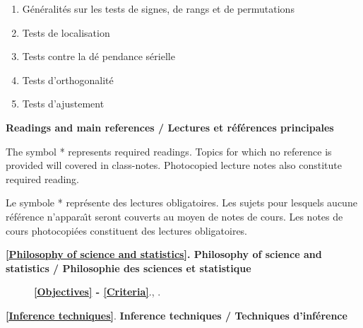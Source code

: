 \documentclass[titlepage,11pt,amstex]{article}
\begin{document}
\begin{enumerate}
\item \label{Sign and rank tests}G\'{e}n\'{e}ralit\'{e}s sur les tests de
signes, de rangs et de permutations

\item \label{Distribution-free location tests}Tests de localisation

\item \label{Distribution-free serial dependence tests}Tests contre la d\'{e}%
pendance s\'{e}rielle

\item \label{Distribution-free orthogonality tests}Tests d'orthogonalit\'{e}

\item \label{Goodness-of-fit tests}Tests d'ajustement
\end{enumerate}

\newpage

\begin{center}
\textbf{Readings and main references / Lectures et r\'{e}f\'{e}rences
principales }

\quad
\end{center}

\quad

The symbol * represents required readings. Topics for which no reference is
provided will covered in class-notes. Photocopied lecture notes also
constitute required reading.

Le symbole * repr\'{e}sente des lectures obligatoires. Les sujets pour
lesquels aucune r\'{e}f\'{e}rence n'appara\^{\i}t seront couverts au moyen
de notes de cours. Les notes de cours photocopi\'{e}es constituent des
lectures obligatoires.

\quad

\noindent \textbf{\ref{Philosophy of science and statistics}. Philosophy of
science and statistics / Philosophie des sciences et statistique}

\quad

\begin{description}
\item[\quad ] \textbf{\ref{Objectives} - \ref{Criteria}}.\quad \cite%
{Dufour(2000)}, \cite{Dufour(2001)}.
\end{description}

\quad

\noindent \textbf{\ref{Inference techniques}}. \textbf{Inference techniques
/ Techniques d'inf\'{e}rence}

\quad
\end{document}
